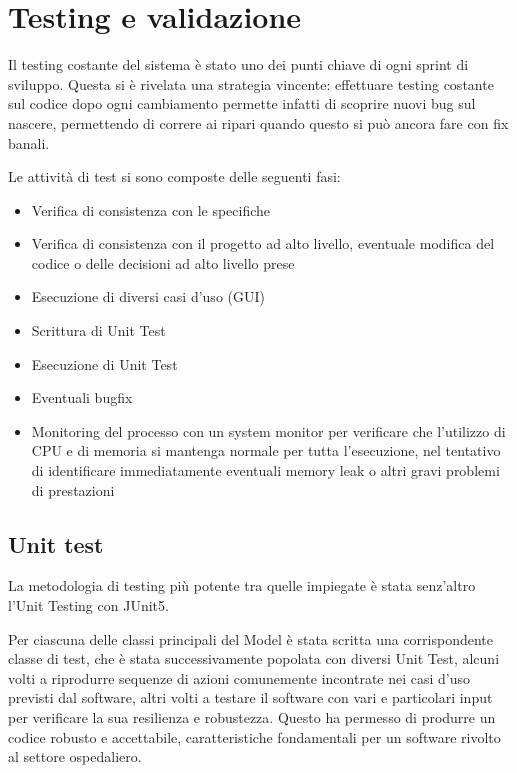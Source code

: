 \documentclass{article}
\begin{document}
\section{Testing e validazione}

Il testing costante del sistema è stato uno dei punti chiave di ogni sprint di sviluppo. Questa si è rivelata una strategia vincente: effettuare testing costante sul codice dopo ogni cambiamento permette infatti di scoprire nuovi bug sul nascere, permettendo di correre ai ripari quando questo si può ancora fare con fix banali.

Le attività di test si sono composte delle seguenti fasi:

\begin{itemize}
    \item Verifica di consistenza con le specifiche
    \item Verifica di consistenza con il progetto ad alto livello, eventuale modifica del codice o delle decisioni ad alto livello prese
    \item Esecuzione di diversi casi d'uso (GUI)
    \item Scrittura di Unit Test
    \item Esecuzione di Unit Test
    \item Eventuali bugfix
    \item Monitoring del processo con un system monitor per verificare che l'utilizzo di CPU e di memoria si mantenga normale per tutta l'esecuzione, nel tentativo di identificare immediatamente eventuali memory leak o altri gravi problemi di prestazioni
\end{itemize}

\subsection{Unit test}

La metodologia di testing più potente tra quelle impiegate è stata senz'altro l'Unit Testing con JUnit5.

Per ciascuna delle classi principali del Model è stata scritta una corrispondente classe di test, che è stata successivamente popolata con diversi Unit Test, alcuni volti a riprodurre sequenze di azioni comunemente incontrate nei casi d'uso previsti dal software, altri volti a testare il software con vari e particolari input per verificare la sua resilienza e robustezza. Questo ha permesso di produrre un codice robusto e accettabile, caratteristiche fondamentali per un software rivolto al settore ospedaliero.
\end{document}
